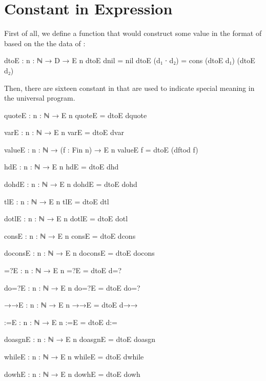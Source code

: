 \section{Constant in Expression}\label{appendix:const of e}
First of all, we define a function that would construct some value in the format of  based on the the data of :
\begin{code}
dtoE : {n : ℕ} → D → E n
dtoE dnil = nil
dtoE (d₁ ∙ d₂) = cons (dtoE d₁) (dtoE d₂)
\end{code}
Then, there are sixteen constant in  that are used to indicate special meaning in the universal \WHILE program.
\begin{code}[fontsize=\footnotesize]
quoteE : {n : ℕ} → E n
quoteE = dtoE dquote

varE : {n : ℕ} → E n
varE = dtoE dvar

valueE : {n : ℕ} → (f : Fin n) → E n
valueE f = dtoE (dftod f)

hdE : {n : ℕ} → E n
hdE = dtoE dhd

dohdE : {n : ℕ} → E n
dohdE = dtoE dohd

tlE : {n : ℕ} → E n
tlE = dtoE dtl

dotlE : {n : ℕ} → E n
dotlE = dtoE dotl

consE : {n : ℕ} → E n
consE = dtoE dcons

doconsE : {n : ℕ} → E n
doconsE = dtoE docons

=?E : {n : ℕ} → E n
=?E = dtoE d=?

do=?E : {n : ℕ} → E n
do=?E = dtoE do=?

→→E : {n : ℕ} → E n
→→E = dtoE d→→

:=E : {n : ℕ} → E n
:=E = dtoE d:=

doasgnE : {n : ℕ} → E n
doasgnE = dtoE doasgn

whileE : {n : ℕ} → E n
whileE = dtoE dwhile

dowhE : {n : ℕ} → E n
dowhE = dtoE dowh
\end{code}

